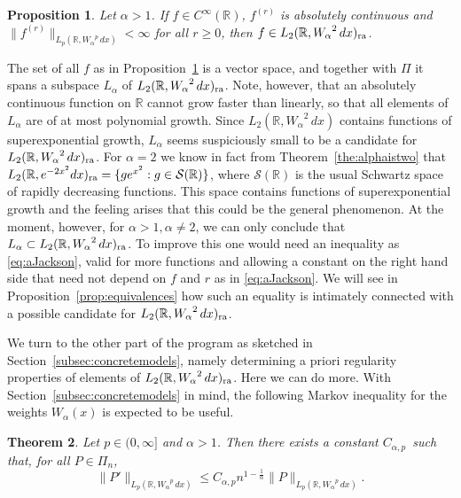 \documentclass[12pt, reqno]{amsart}
\numberwithin{equation}{section}
\theoremstyle{plain}
\newtheorem{theorem}{Theorem}[section]
\newtheorem{proposition}[theorem]{Proposition}
\theoremstyle{definition}
\begin{document}
\begin{proposition}\label{prop:subspace}
 Let $\alpha>1$. If $f\in C^\infty({{\mathbb R}})$, $f^{(r)}$ is absolutely continuous and $\|f^{(r)}\|_{{L_p({{\mathbb R}}, {W_\alpha}^p\,dx)}}<\infty$ for all $r\geq 0$, then $f\in{L_2({{\mathbb R}},{W_\alpha}^2\,dx)_{\textup{ra}}}$.
\end{proposition}

The set of all $f$ as in Proposition~\ref{prop:subspace} is a vector space, and together with $\Pi$ it spans a subspace $L_\alpha$ of ${L_2({{\mathbb R}},{W_\alpha}^2\,dx)_{\textup{ra}}}$. Note, however, that an absolutely continuous function on ${{\mathbb R}}$ cannot grow faster than linearly, so that all elements of $L_\alpha$ are of at most polynomial growth. Since ${{L_2({{\mathbb R}}, {W_\alpha}^2\,dx)}}$ contains functions of superexponential growth, $L_\alpha$ seems suspiciously small to be a candidate for ${L_2({{\mathbb R}},{W_\alpha}^2\,dx)_{\textup{ra}}}$. For $\alpha=2$ we know in fact from Theorem~\ref{the:alphaistwo} that ${L_2({{\mathbb R}},e^{-2x^2}dx)_{\textup{ra}}}=\{ge^{x^2} : g\in{{\mathcal S}}({{\mathbb R}})\}$, where ${{\mathcal S}}({{\mathbb R}})$ is the usual Schwartz space of rapidly decreasing functions. This space contains functions of superexponential growth and the feeling arises that this could be the general phenomenon. At the moment, however, for $\alpha>1, \alpha\neq 2$, we can only conclude that $L_\alpha\subset{L_2({{\mathbb R}},{W_\alpha}^2\,dx)_{\textup{ra}}}$. To improve this one would need an inequality as \eqref{eq:aJackson}, valid for more functions and allowing a constant on the right hand side that need not depend on $f$ and $r$ as in \eqref{eq:aJackson}. We will see in Proposition~\ref{prop:equivalences} how such an equality is intimately connected with a possible candidate for ${L_2({{\mathbb R}},{W_\alpha}^2\,dx)_{\textup{ra}}}$.

We turn to the other part of the program as sketched in Section~\ref{subsec:concretemodels}, namely determining a priori regularity properties of elements of ${L_2({{\mathbb R}},{W_\alpha}^2\,dx)_{\textup{ra}}}$. Here we can do more. With Section~\ref{subsec:concretemodels} in mind, the following Markov inequality \cite[equation~(7.3)]{Lu} for the weights ${W_\alpha}(x)$ is expected to be useful.
\begin{theorem}\label{the:aMarkov}
Let $p\in(0,\infty]$ and $\alpha>1$. Then there exists a constant $C_{\alpha,p}$\ such that, for all $P\in{{\Pi_n}}$,
\begin{equation}\label{eq:Markov}
\|P'\|_{{L_p({{\mathbb R}}, {W_\alpha}^p\,dx)}}\leq C_{\alpha,p} n^{1-\frac{1}{\alpha}}\|P\|_{{L_p({{\mathbb R}}, {W_\alpha}^p\,dx)}}.
\end{equation}
\end{theorem}
\end{document}
